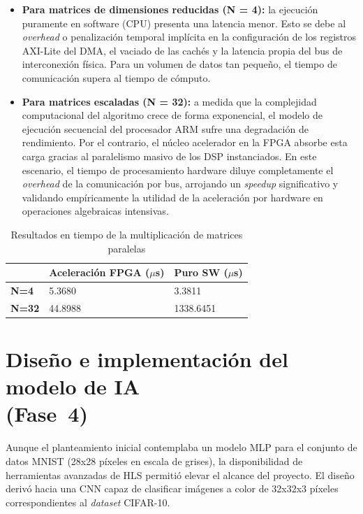 \begin{itemize}
  \item \textbf{Para matrices de dimensiones reducidas (N = 4):} la ejecución puramente
    en software (\ac{CPU}) presenta una latencia menor. Esto se debe al \textit{overhead} o
    penalización temporal implícita en la configuración de los registros \ac{AXI}-Lite del
    \ac{DMA}, el vaciado de las cachés y la latencia propia del bus de interconexión física.
    Para un volumen de datos tan pequeño, el tiempo de comunicación supera al tiempo de cómputo.
  \item \textbf{Para matrices escaladas (N = 32):} a medida que la complejidad
    computacional del algoritmo crece de forma exponencial, el modelo de ejecución
    secuencial del procesador \ac{ARM} sufre una degradación de rendimiento. Por el contrario,
    el núcleo acelerador en la \ac{FPGA} absorbe esta carga gracias al paralelismo masivo de
    los \ac{DSP} instanciados. En este escenario, el tiempo de procesamiento hardware diluye
    completamente el \textit{overhead} de la comunicación por bus, arrojando un \textit{speedup}
    significativo y validando empíricamente la utilidad de la aceleración por hardware en
    operaciones algebraicas intensivas.
\end{itemize}

\begin{table}[h!]
  \centering
  \begin{tabular}{|l|l|l|}
    \hline
    & \textbf{Aceleración \ac{FPGA} ($\mu$s)} & \textbf{Puro \ac{SW} ($\mu$s)} \\ \hline
    \textbf{N=4}  & 5.3680        & 3.3811      \\ \hline
    \textbf{N=32} & 44.8988        & 1338.6451   \\ \hline
  \end{tabular}
  \caption{Resultados en tiempo de la multiplicación de matrices paralelas}
  \label{tab:resultadosMatrices}
\end{table}

\section{\nohyphens{Diseño e implementación del modelo de IA\\(Fase~4)}}
Aunque el planteamiento inicial contemplaba un modelo \ac{MLP} para el
conjunto de datos \ac{MNIST} (28x28 píxeles en escala de grises), la disponibilidad de herramientas
avanzadas de \ac{HLS} permitió elevar el alcance del proyecto.
El diseño derivó hacia una \ac{CNN} capaz de clasificar imágenes a
color de 32x32x3 píxeles correspondientes al \textit{dataset} \ac{CIFAR}-10.

